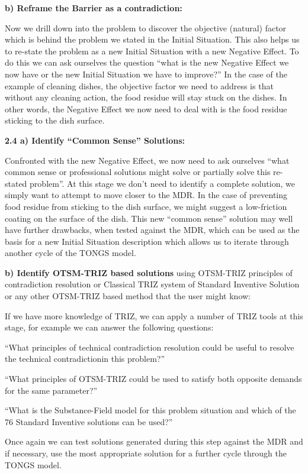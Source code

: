 \documentclass[11pt,a4paper]{article}
\begin{document}
\textbf{b) Reframe the Barrier as a contradiction:}

Now we drill down into the problem to discover the objective (natural) factor
which is behind the problem we stated in the Initial Situation. This also
helps us to re-state the problem as a new Initial Situation with a new
Negative Effect. To do this we can ask ourselves the question “what is the new
Negative Effect we now have or the new Initial Situation we have to improve?”
In the case of the example of cleaning dishes, the objective factor we need to
address is that without any cleaning action, the food residue will stay stuck
on the dishes. In other words, the Negative Effect we now need to deal with is
the food residue sticking to the dish surface.

\textbf{2.4 a) Identify “Common Sense” Solutions:}

Confronted with the new Negative Effect, we now need to ask ourselves “what
common sense or professional solutions might solve or partially solve this
re-stated problem”. At this stage we don’t need to identify a complete
solution, we simply want to attempt to move closer to the MDR.  In the case of
preventing food residue from sticking to the dish surface, we might suggest a
low-friction coating on the surface of the dish.  This new “common sense”
solution may well have further drawbacks, when tested against the MDR, which
can be used as the basis for a new Initial Situation description which allows
us to iterate through another cycle of the TONGS model.

\textbf{b) Identify OTSM-TRIZ based solutions} using OTSM-TRIZ principles of
contradiction resolution or Classical TRIZ system of Standard Inventive
Solution or any other OTSM-TRIZ based method that the user might know:

If we have more knowledge of TRIZ, we can apply a number of TRIZ tools at this
stage, for example we can answer the following questions:

“What principles of technical contradiction resolution could be useful to
resolve the technical contradictionin this problem?”

“What principles of OTSM-TRIZ could be used to satisfy both opposite demands
for the same parameter?”

“What is the Substance-Field model for this problem situation and which of the
76 Standard Inventive solutions can be used?”

Once again we can test solutions generated during this step against the MDR
and if necessary, use the most appropriate solution for a further cycle
through the TONGS model.
\end{document}
